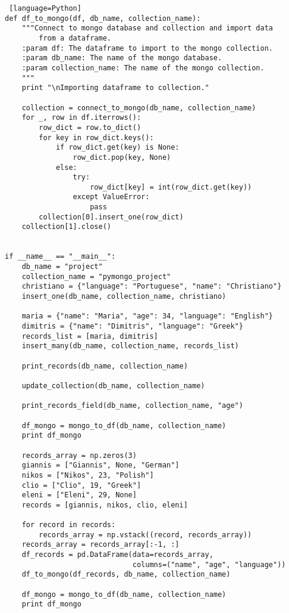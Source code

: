 \documentclass[11pt]{article}
\begin{document}
\begin{lstlisting} [language=Python]
def df_to_mongo(df, db_name, collection_name):
    """Connect to mongo database and collection and import data
        from a dataframe.
    :param df: The dataframe to import to the mongo collection.
    :param db_name: The name of the mongo database.
    :param collection_name: The name of the mongo collection.
    """
    print "\nImporting dataframe to collection."

    collection = connect_to_mongo(db_name, collection_name)
    for _, row in df.iterrows():
        row_dict = row.to_dict()
        for key in row_dict.keys():
            if row_dict.get(key) is None:
                row_dict.pop(key, None)
            else:
                try:
                    row_dict[key] = int(row_dict.get(key))
                except ValueError:
                    pass
        collection[0].insert_one(row_dict)
    collection[1].close()


if __name__ == "__main__":
    db_name = "project"
    collection_name = "pymongo_project"
    christiano = {"language": "Portuguese", "name": "Christiano"}
    insert_one(db_name, collection_name, christiano)

    maria = {"name": "Maria", "age": 34, "language": "English"}
    dimitris = {"name": "Dimitris", "language": "Greek"}
    records_list = [maria, dimitris]
    insert_many(db_name, collection_name, records_list)

    print_records(db_name, collection_name)

    update_collection(db_name, collection_name)

    print_records_field(db_name, collection_name, "age")

    df_mongo = mongo_to_df(db_name, collection_name)
    print df_mongo

    records_array = np.zeros(3)
    giannis = ["Giannis", None, "German"]
    nikos = ["Nikos", 23, "Polish"]
    clio = ["Clio", 19, "Greek"]
    eleni = ["Eleni", 29, None]
    records = [giannis, nikos, clio, eleni]

    for record in records:
        records_array = np.vstack((record, records_array))
    records_array = records_array[:-1, :]
    df_records = pd.DataFrame(data=records_array,
                              columns=("name", "age", "language"))
    df_to_mongo(df_records, db_name, collection_name)

    df_mongo = mongo_to_df(db_name, collection_name)
    print df_mongo

\end{lstlisting}
\end{document}
